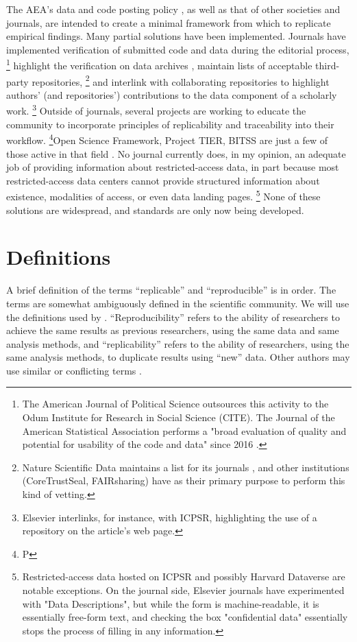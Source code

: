 \documentclass[AEJ]{AEA}
\begin{document}
The \ac{AEA}'s data and code posting policy \citep{American_Economic_Association2008-az}, as well as that of other societies and journals, are intended to create a minimal framework from which to replicate empirical findings. Many partial solutions have been implemented. Journals have implemented verification of submitted code and data during the editorial process,%
\footnote{The American Journal of Political Science outsources this activity to the Odum Institute for Research in Social Science (CITE). The Journal of the American Statistical Association performs a "broad evaluation of quality and potential for usability of the code and data" since 2016 \citep{Stodden2016-uc}.}
highlight the verification on data archives \citep{Open_Science_Framework2017-zc}, maintain lists of acceptable third-party repositories,%
\footnote{Nature Scientific Data maintains a list for its journals \citep{Nature_Scientific_Data2016-hl}, and other institutions (CoreTrustSeal, FAIRsharing) have as their primary purpose to perform this kind of vetting.} 
and interlink with collaborating repositories to highlight authors' (and repositories') contributions to the data component of a scholarly work.%
\footnote{Elsevier interlinks, for instance, with ICPSR, highlighting the use of a repository on the article's web page.}
Outside of journals, several projects are working to educate the community to incorporate principles of replicability and traceability into their workflow.%
\footnote{P}Open Science Framework, Project TIER, BITSS are just a few of those active in that field \citep{Gentzkow2014-va,Wilson2016-bt}.
No journal currently does, in my opinion, an adequate job of providing information about restricted-access data, in part because most restricted-access data centers cannot provide structured information about existence, modalities of access, or even data landing pages.%
\footnote{Restricted-access data hosted on ICPSR and possibly Harvard Dataverse are notable exceptions. On the journal side, Elsevier journals have experimented with "Data Descriptions", but while the form is machine-readable, it is essentially free-form text, and checking the box "confidential data" essentially stops the process of filling in any information.} 
None of these solutions are widespread, and standards are only now being developed.

\section{Definitions}
A brief definition of the terms ``replicable'' and ``reproducible'' is in order. The terms are somewhat ambiguously defined in the scientific community. We will use the definitions used by \cite{Bollen2015-vb}. ``Reproducibility''  refers to the ability of researchers to achieve the same results as previous researchers, using the same data and same analysis methods, and ``replicability''  refers to the ability of researchers, using the same analysis methods, to duplicate results using ``new'' data. Other authors may use similar or conflicting terms \citep{Clemens2017-zj}. 
\end{document}
